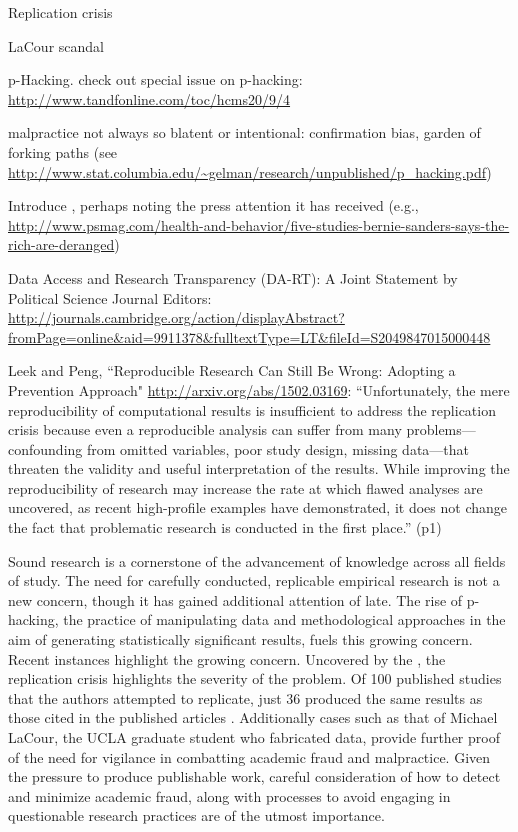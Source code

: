 
Replication crisis

LaCour scandal

p-Hacking.  check out special issue on p-hacking: \url{http://www.tandfonline.com/toc/hcms20/9/4}

malpractice not always so blatent or intentional: confirmation bias, garden of forking paths (see \url{http://www.stat.columbia.edu/~gelman/research/unpublished/p_hacking.pdf})

Introduce \citet{Newman2015}, perhaps noting the press attention it has received (e.g., \url{http://www.psmag.com/health-and-behavior/five-studies-bernie-sanders-says-the-rich-are-deranged})

Data Access and Research Transparency (DA-RT): A Joint Statement by Political Science Journal Editors: \url{http://journals.cambridge.org/action/displayAbstract?fromPage=online&aid=9911378&fulltextType=LT&fileId=S2049847015000448}

Leek and Peng, ``Reproducible Research Can Still Be Wrong: Adopting a Prevention Approach" \url{http://arxiv.org/abs/1502.03169}: ``Unfortunately, the mere reproducibility of computational results is insufficient to address the replication crisis because even a reproducible analysis can suffer from many problems—confounding from omitted variables, poor study design, missing data—that threaten the validity and useful interpretation of the results. While improving the reproducibility of research may increase the rate at which flawed analyses are uncovered, as recent high-profile examples have demonstrated, it does not change the fact that problematic research is conducted in the first place.'' (p1)

Sound research is a cornerstone of the advancement of knowledge across all fields of study. The need for carefully conducted, replicable empirical research is not a new concern, though it has gained additional attention of late. The rise of p-hacking, the practice of manipulating data and methodological approaches in the aim of generating statistically significant results, fuels this growing concern. Recent instances highlight the growing concern. Uncovered by the \citet{OpenScienceCollaboration2015}, the replication crisis highlights the severity of the problem. Of 100 published studies that the authors attempted to replicate, just 36 produced the same results as those cited in the published articles \citep{OpenScienceCollaboration2015}. Additionally cases such as that of Michael LaCour, the UCLA graduate student who fabricated data, provide further proof of the need for vigilance in combatting academic fraud and malpractice. Given the pressure to produce publishable work, careful consideration of how to detect and minimize academic fraud, along with processes to avoid engaging in questionable research practices are of the utmost importance.

